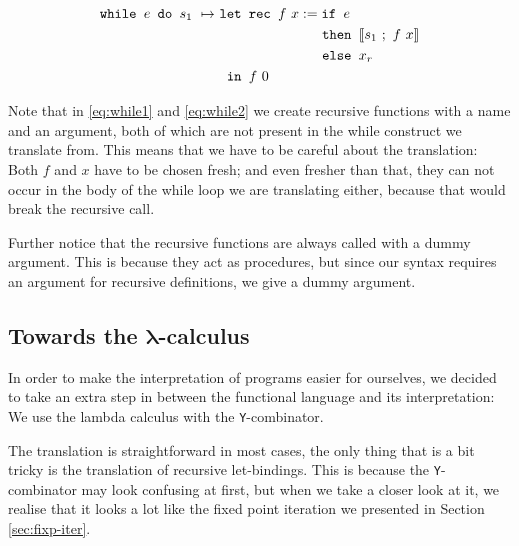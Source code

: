 \documentclass[11pt, leqno, titlepage]{article}
\theoremstyle{definition}
\begin{document}
\begin{align}
  \texttt{while } e \texttt{ do } s_1
                    ~\mapsto~ & \texttt{let rec } f~x :=
                                 \texttt{if } e \label{eq:while2}\\
                    & \phantom{{}=11111111111}\texttt{ then } \llbracket s_1 ~;~ f~x \rrbracket\notag\\
                    & \phantom{{}=11111111111}\texttt{ else } x_r \notag\\
                    & \texttt{ in } f~0\notag
\end{align}

Note that in \ref{eq:while1} and \ref{eq:while2} we create recursive functions with a
name and an argument, both of which are not present in the while construct we
translate from. This means that we have to be careful about the translation: Both $f$
and $x$ have to be chosen fresh; and even fresher than that, they can not occur in
the body of the while loop we are translating either, because that would break the
recursive call.

Further notice that the recursive functions are always called with a dummy
argument. This is because they act as procedures, but since our syntax requires an
argument for recursive definitions, we give a dummy argument.


\subsection{Towards the $\mathbf{\lambda}$-calculus}\label{sec:fun-to-lambda}  

In order to make the interpretation of programs easier for ourselves, we decided to
take an extra step in between the functional language and its interpretation: We use
the lambda calculus with the \texttt{Y}-combinator.

The translation is straightforward in most cases, the only thing that is a bit tricky
is the translation of recursive let-bindings. This is because the
\texttt{Y}-combinator may look confusing at first, but when we take a closer look at
it, we realise that it looks a lot like the fixed point iteration we presented in
Section \ref{sec:fixp-iter}.
\end{document}
